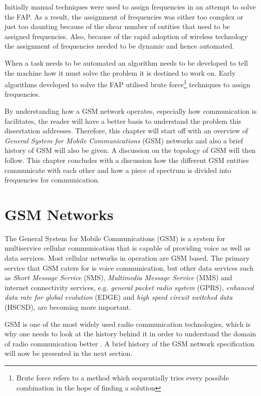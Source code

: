 Initially manual techniques were used to assign frequencies in an attempt to solve the FAP\cite{Karen2004}. As a result, the assignment of frequencies was either too complex or just too daunting because of the shear number of entities that need to be assigned frequencies\cite{Karen2004}. Also, because of the rapid adoption of wireless technology the assignment of frequencies needed to be dynamic and hence automated\cite{Karen2004}.

When a task needs to be automated an algorithm needs to be developed to tell the machine how it must solve the problem it is destined to work on. Early algorithms developed to solve the FAP utilised brute force\footnote{Brute force refers to a method which sequentially tries every possible combination in the hope of finding a solution} techniques to assign frequencies\cite{Karen2004,Eisenblatter}.

By understanding how a GSM network operates, especially how communication is facilitates, the reader will have a better basis to understand the problem this dissertation addresses. Therefore, this chapter will start off with an overview of \emph{General System for Mobile Communications} (GSM) networks and also a brief history of GSM will also be given. A discussion on the topology of GSM will then follow. This chapter concludes with a discussion how the different GSM entities communicate with each other and how a piece of spectrum is divided into frequencies for communication.

\section{GSM Networks}
The General System for Mobile Communications (GSM) is a system for multiservice cellular communication that is capable of providing voice as well as data services\cite{GSMArchitectureProtocolsServices,wirelesstelcoMullet}. Most cellular networks in operation are GSM based\cite{Karen2004,wirelesstelcoMullet}. The primary service that GSM caters for is voice communication, but other data services such as \emph{Short Message Service} (SMS), \emph{Multimedia Message Service} (MMS) and internet connectivity services, e.g. \emph{general packet radio system} (GPRS), \emph{enhanced data rate for global evolution} (EDGE) and \emph{high speed circuit switched data} (HSCSD), are becoming more important\cite{GSMArchitectureProtocolsServices,Eisenblatter}.

GSM is one of the most widely used radio communication technologies, which is why one needs to look at the history behind it in order to understand the domain of radio communication better \cite{GSMArchitectureProtocolsServices}. A brief history of the GSM network specification will now be presented in the next section.


